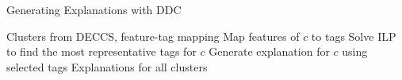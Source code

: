 \documentclass{article}
\begin{document}
\begin{algorithm}[H]
\caption{Generating Explanations with DDC}
\begin{algorithmic}[1]
\REQUIRE Clusters from DECCS, feature-tag mapping
   \STATE Map features of $c$ to tags
   \STATE Solve ILP to find the most representative tags for $c$
   \STATE Generate explanation for $c$ using selected tags
\ENDFOR
\ENSURE Explanations for all clusters
\end{algorithmic}
\end{algorithm}
\end{document}
